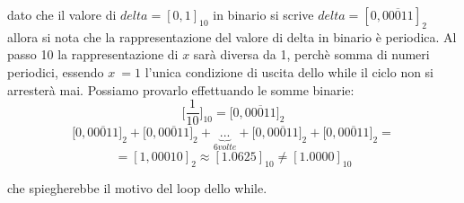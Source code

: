 
dato che il valore di $delta=[0,1]_{10}$ in binario si scrive $delta=[0,\overline{00011}]_2$ allora si nota che la rappresentazione del valore di delta in binario è periodica. Al passo 10 la rappresentazione di $x$ sarà diversa da 1, perchè somma di numeri periodici, essendo $x~=1$ l'unica condizione di uscita dello while il ciclo non si arresterà mai. Possiamo provarlo effettuando le somme binarie:
\[
\Big[\frac{1}{10}\Big]_{10}=\Big[0,\overline{00011}\Big]_2
\]
\[
\Big[0,\overline{00011}\Big]_2+\Big[0,\overline{00011}\Big]_2+ \underbrace{...}_{6volte}+\Big[0,\overline{00011}\Big]_2+\Big[0,\overline{00011}\Big]_2 = 
\]
\[
= [1,00010]_2 \approx [1.0625]_{10} \neq [1.0000]_{10}
\]

che spiegherebbe il motivo del loop dello while.